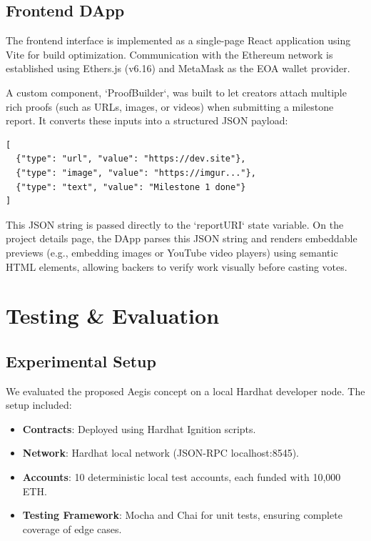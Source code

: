 \documentclass[conference]{IEEEtran}
\begin{document}
\subsection{Frontend DApp}
The frontend interface is implemented as a single-page React \cite{react} application using Vite \cite{vite} for build optimization. Communication with the Ethereum network is established using Ethers.js \cite{ethersjs} (v6.16) and MetaMask \cite{metamask} as the EOA wallet provider. 

A custom component, `ProofBuilder`, was built to let creators attach multiple rich proofs (such as URLs, images, or videos) when submitting a milestone report. It converts these inputs into a structured JSON payload:
\begin{verbatim}
[
  {"type": "url", "value": "https://dev.site"},
  {"type": "image", "value": "https://imgur..."},
  {"type": "text", "value": "Milestone 1 done"}
]
\end{verbatim}
This JSON string is passed directly to the `reportURI` state variable. On the project details page, the DApp parses this JSON string and renders embeddable previews (e.g., embedding images or YouTube video players) using semantic HTML elements, allowing backers to verify work visually before casting votes.

\section{Testing \& Evaluation}

\subsection{Experimental Setup}
We evaluated the proposed Aegis concept on a local Hardhat developer node. The setup included:
\begin{itemize}
	\item \textbf{Contracts}: Deployed using Hardhat Ignition scripts.
	\item \textbf{Network}: Hardhat local network (JSON-RPC localhost:8545).
	\item \textbf{Accounts}: 10 deterministic local test accounts, each funded with 10,000 ETH.
	\item \textbf{Testing Framework}: Mocha and Chai for unit tests, ensuring complete coverage of edge cases.
\end{itemize}
\end{document}
